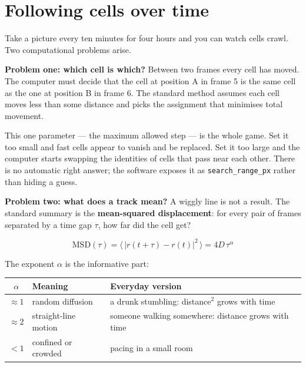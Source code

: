\documentclass[11pt,a4paper]{article}
\begin{document}
\section{Following cells over time}

Take a picture every ten minutes for four hours and you can watch cells crawl.
Two computational problems arise.

\textbf{Problem one: which cell is which?} Between two frames every cell has
moved. The computer must decide that the cell at position A in frame 5 is the
same cell as the one at position B in frame 6. The standard method assumes each
cell moves less than some distance and picks the assignment that minimises total
movement.

\begin{warnbox}
This one parameter --- the maximum allowed step --- is the whole game. Set it
too small and fast cells appear to vanish and be replaced. Set it too large and
the computer starts swapping the identities of cells that pass near each other.
There is no automatic right answer; the software exposes it as
\texttt{search\_range\_px} rather than hiding a guess.
\end{warnbox}

\textbf{Problem two: what does a track mean?} A wiggly line is not a result.
The standard summary is the \textbf{mean-squared displacement}: for every pair
of frames separated by a time gap $\tau$, how far did the cell get?

\begin{equation}
\mathrm{MSD}(\tau)=\big\langle\,|r(t+\tau)-r(t)|^2\,\big\rangle = 4D\,\tau^{\alpha}
\end{equation}

The exponent $\alpha$ is the informative part:

\begin{center}\small
\begin{tabular}{cll}
\toprule
$\alpha$ & \textbf{Meaning} & \textbf{Everyday version} \\
\midrule
$\approx 1$ & random diffusion & a drunk stumbling: distance$^2$ grows with time \\
$\approx 2$ & straight-line motion & someone walking somewhere: distance grows with time \\
$<1$ & confined or crowded & pacing in a small room \\
\bottomrule
\end{tabular}
\end{center}
\end{document}
